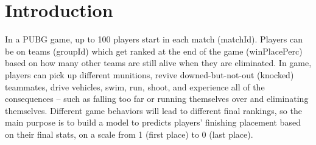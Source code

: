 \section{Introduction}\label{sec-intro}











In a PUBG game, up to 100 players start in each match (matchId). Players can be on teams (groupId) which get ranked at the end of the game
(winPlacePerc) based on how many other teams are still alive when they
are eliminated. In game, players can pick up different munitions, revive
downed-but-not-out (knocked) teammates, drive vehicles, swim, run, shoot,
and experience all of the consequences – such as falling too far or running
themselves over and eliminating themselves. Different game behaviors will
lead to different final rankings, so the main purpose is to build a model to
predicts players’ finishing placement based on their final stats, on a scale
from 1 (first place) to 0 (last place).



